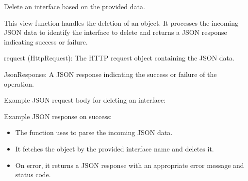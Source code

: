 \documentclass[letterpaper,10pt,english]{sphinxmanual}
\begin{document}

\begin{fulllineitems}
\label{\detokenize{app:app.views.delete_interface}}
\pysigstartsignatures
{}
\pysigstopsignatures
\sphinxAtStartPar
Delete an interface based on the provided data.

\sphinxAtStartPar
This view function handles the deletion of an  object. 
It processes the incoming JSON data to identify the interface to delete and 
returns a JSON response indicating success or failure.
\begin{description}
\sphinxAtStartPar
request (HttpRequest): The HTTP request object containing the JSON data.

\sphinxAtStartPar
JsonResponse: A JSON response indicating the success or failure of the operation.

\sphinxAtStartPar
Example JSON request body for deleting an interface:

\begin{sphinxVerbatim}[commandchars=\\\{\}]
\end{sphinxVerbatim}

\sphinxAtStartPar
Example JSON response on success:

\begin{sphinxVerbatim}[commandchars=\\\{\}]
\end{sphinxVerbatim}

\begin{itemize}
\item {} 
\sphinxAtStartPar
The function uses  to parse the incoming JSON data.

\item {} 
\sphinxAtStartPar
It fetches the  object by the provided interface name and deletes it.

\item {} 
\sphinxAtStartPar
On error, it returns a JSON response with an appropriate error message and status code.

\end{itemize}

\end{description}

\end{fulllineitems}
\end{document}
